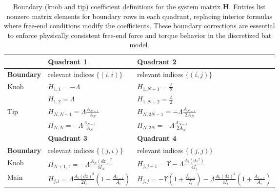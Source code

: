 \documentclass[linenumbers]{aastex7}
\begin{document}
\begin{table}[htbp]
	\centering
	{\renewcommand{\arraystretch}{1.6}
		\begin{tabular}{|p{}|p{}|p{}|}
			\hline
			                  & \textbf{Quadrant 1}                                                                                                                          & \textbf{Quadrant 2}           \\
			\hline
			\textbf{Boundary} & relevant indices $\{(i, i)\}$                                                                                                                & relevant indices $\{(i, j)\}$ \\

			\hline \hline
			Knob
			                  & $\displaystyle H_{1,1} = -\Lambda$
			                  & $\displaystyle H_{1, N+1} = \frac{\Lambda}{2}$
			\\
			                  & $\displaystyle H_{1, 2} = \Lambda$
			                  & $\displaystyle H_{1, N+2} = \frac{\Lambda}{2}$
			\\

			Tip
			                  & $\displaystyle H_{N,N-1} = \Lambda \frac{A_{N-1}}{A_N}$
			                  & $\displaystyle H_{N, 2N-1} = -\Lambda \frac{A_{N-1}}{2A_N}$
			\\

			                  & $\displaystyle H_{N,N} = -\Lambda \frac{A_{N-1}}{A_N}$
			                  & $\displaystyle H_{N, 2N} = -\Lambda \frac{A_{N-1}}{2A_N}$
			\\


			\hline
			\hline
			                  & \textbf{Quadrant 3}                                                                                                                          & \textbf{Quadrant 4}           \\
			\hline
			\textbf{Boundary} & relevant indices $\{(j, i)\}$                                                                                                                & relevant indices $\{(j, j)\}$ \\

			\hline \hline
			Knob
			                  & $\displaystyle H_{N+1, 1} = -\Lambda \frac{A_N(dz)^2}{4I_N}$
			                  & $\displaystyle H_{j, j+1} = \Upsilon - \Lambda \frac{A_i (dz^2)}{4I_i}$
			\\
			Main
			                  & $\displaystyle H_{j,i} = \Lambda \frac{A_i (dz)^2}{2I_i}\left(1 - \frac{A_{i-1}}{A_i}\right)$
			                  & $\displaystyle H_{j, j} = -\Upsilon\left(1 + \frac{I_{i-1}}{I_i}\right) - \Lambda\frac{A_i (dz)^2}{4I_i}\left(1+\frac{A_{i-1}}{A_i}\right) $
			\\
			\hline
		\end{tabular}
	}
	\caption{Boundary (knob and tip) coefficient definitions for the system matrix $\mathbf{H}$. Entries list nonzero matrix elements for boundary rows in each quadrant, replacing interior formulas where free-end conditions modify the coefficients. These boundary corrections are essential to enforce physically consistent free-end force and torque behavior in the discretized bat model.}
	\label{tab:Hboundary}
\end{table}

\begin{acknowledgments}

\end{acknowledgments}

\nocite{*}


\end{document}
